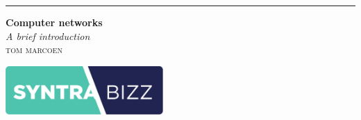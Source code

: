 

\clearforchapter

\begin{titlepage} %
\thispagestyle{empty}
	\raggedleft %
	
	\rule{1pt}{\textheight} %
	\hspace{0.05\textwidth} %
	\parbox[b]{0.75\textwidth}{ %
		
		{\Huge\bfseries Computer networks}\\[2\baselineskip] %
		{\large\textit{A brief introduction}}\\[4\baselineskip] %
		{\Large\textsc{tom marcoen}} %
		
		\vspace{0.5\textheight} %
		
		{\noindent \includegraphics[width=6cm]{images/logo-cropped.pdf}}\\[\baselineskip] %
	}

\end{titlepage}